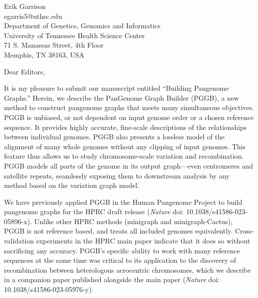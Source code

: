 \documentclass[12pt,hidelinks,letterpaper]{article}
\begin{document}
\begin{flushright}
  Erik Garrison \\
  egarris5@uthsc.edu \\
  Department of Genetics, Genomics and Informatics \\
  University of Tennessee Health Science Center \\
  71 S. Manassas Street, 4th Floor \\
  Memphis, TN 38163, USA
\end{flushright}



\hfill \break

Dear Editors,
\hfill \break

It is my pleasure to submit our manuscript entitled ``Building Pangenome Graphs.''
Herein, we describe the PanGenome Graph Builder (PGGB), a new method to construct pangenome graphs that meets many simultaneous objectives.
PGGB is unbiased, or not dependent on input genome order or a chosen reference sequence.
It provides highly accurate, fine-scale descriptions of the relationships between individual genomes.
PGGB also presents a lossless model of the alignment of many whole genomes without any clipping of input genomes.
This feature thus allows us to study chromosome-scale variation and recombination.
PGGB models all parts of the genome in its output graph---even centromeres and satellite repeats, seamlessly exposing them to downstream analysis by any method based on the variation graph model.

We have previously applied PGGB in the Human Pangenome Project to build pangenome graphs for the HPRC draft release (\textit{Nature} doi: 10.1038/s41586-023-05896-x).
Unlike other HPRC methods (minigraph and minigraph-Cactus), PGGB is not reference based, and treats all included genomes equivalently.
Cross-validation experiments in the HPRC main paper indicate that it does so without sacrificing any accuracy.
PGGB's specific ability to work with many reference sequences at the same time was critical to its application to the discovery of recombination between heterologous acrocentric chromosomes, which we describe in a companion paper published alongside the main paper (\textit{Nature} doi: 10.1038/s41586-023-05976-y).
\end{document}
